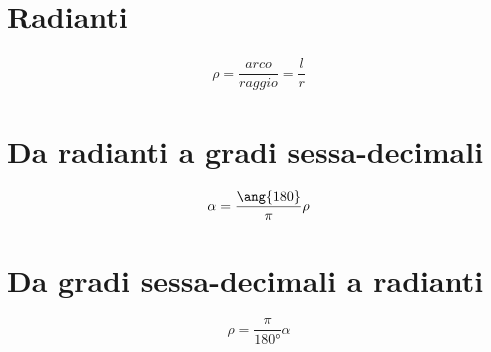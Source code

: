 \section{Radianti}
\begin{center}
	
\end{center}
\begin{align}
\rho=\dfrac{arco}{raggio}=\dfrac{l}{r}
\end{align}
\section{Da radianti a gradi sessa-decimali}
\begin{equation}\index{Angoli!conversione!radianti gradi}
\alpha=\dfrac{\ang{180}}{\pi}\rho
\end{equation}
\section{Da gradi sessa-decimali a radianti}
\begin{equation}
\rho=\dfrac{\pi}{\ang{180}}\alpha
\end{equation}